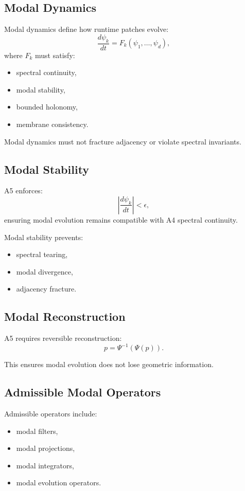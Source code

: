 \subsection{Modal Dynamics}

Modal dynamics define how runtime patches evolve:
\[
\frac{d\psi_k}{dt} = F_k(\psi_1, \ldots, \psi_d),
\]
where $F_k$ must satisfy:
\begin{itemize}
  \item spectral continuity,
  \item modal stability,
  \item bounded holonomy,
  \item membrane consistency.
\end{itemize}

Modal dynamics must not fracture adjacency or violate spectral invariants.

\subsection{Modal Stability}

A5 enforces:
\[
\left| \frac{d\psi_k}{dt} \right| < \epsilon,
\]
ensuring modal evolution remains compatible with A4 spectral continuity.

Modal stability prevents:
\begin{itemize}
  \item spectral tearing,
  \item modal divergence,
  \item adjacency fracture.
\end{itemize}

\subsection{Modal Reconstruction}

A5 requires reversible reconstruction:
\[
p = \Psi^{-1}(\Psi(p)).
\]

This ensures modal evolution does not lose geometric information.

\subsection{Admissible Modal Operators}

Admissible operators include:
\begin{itemize}
  \item modal filters,
  \item modal projections,
  \item modal integrators,
  \item modal evolution operators.
\end{itemize}

